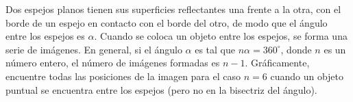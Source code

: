 \item Dos espejos planos tienen sus superficies reflectantes una frente a la otra, con el borde de un espejo en contacto con el borde del otro, de modo que el ángulo entre los espejos es $\alpha$. Cuando se coloca un objeto entre los espejos, se forma una serie de imágenes. En general, si el ángulo $\alpha$ es tal que $n\alpha = 360^\circ$, donde $n$ es un número entero, el número de imágenes formadas es $n - 1$. Gráficamente, encuentre todas las posiciones de la imagen para el caso $n = 6$ cuando un objeto puntual se encuentra entre los espejos (pero no en la bisectriz del ángulo).
